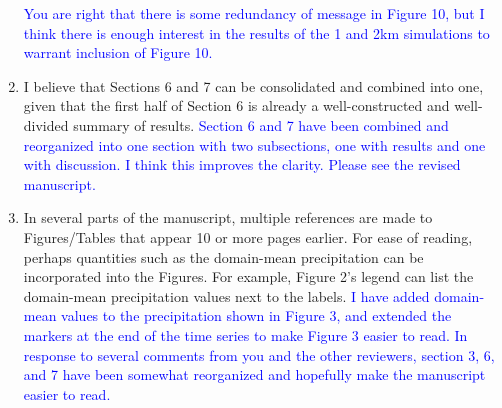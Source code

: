 \documentclass[draft]{agujournal2019}
\begin{document}
\begin{enumerate}
  \textcolor{blue}{You are right that there is some redundancy of message in Figure 10, but I think there is enough interest in the results of the 1 and 2km simulations to warrant inclusion of Figure 10. }
  
  \item I believe that Sections 6 and 7 can be consolidated and combined into one, given that the first half of Section 6 is already a well-constructed and well-divided summary of results.
  \textcolor{blue}{Section 6 and 7 have been combined and reorganized into one section with two subsections, one with results and one with discussion.  I think this improves the clarity.  Please see the revised manuscript.}
  \item In several parts of the manuscript, multiple references are made to Figures/Tables that appear 10 or more pages earlier. For ease of reading, perhaps quantities such as the domain-mean precipitation can be incorporated into the Figures. For example, Figure 2's legend can list the domain-mean precipitation values next to the labels.
  \textcolor{blue}{I have added domain-mean values to the precipitation shown in Figure 3, and extended the markers at the end of the time series to make Figure 3 easier to read.  
  In response to several comments from you and the other reviewers, section 3, 6, and 7 have been somewhat reorganized and hopefully make the manuscript easier to read. }
\end{enumerate}
\end{document}
